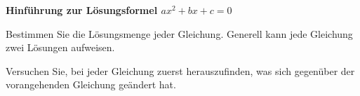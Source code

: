 



\usepackage{amssymb} 
\renewcommand{\metaHeaderLine}{Arbeitsblatt}
\renewcommand{\arbeitsblattTitel}{Einführung zur quadratischen Ergänzung}

\arbeitsblattHeader{}

\textbf{Hinführung zur Lösungsformel $ax^2+bx+c=0$}

Bestimmen Sie die Lösungsmenge jeder Gleichung. Generell kann jede Gleichung zwei Lösungen aufweisen.

Versuchen Sie, bei jeder Gleichung zuerst herauszufinden, was sich gegenüber der vorangehenden Gleichung geändert hat.

\newcommand{\noteSpace}{\noTRAINER{\mmPapier{4}}}

\newcommand{\quadGleichung}[4]{
\TRAINER{\hrulefill\\}%
\par
\needspace{4\baselineskip}
\begin{samepage}
\stepcounter{nuemmerli}(\thenuemmerli. )\,\,\,\, #1\\
\noTRAINER{\mmPapier{#2}}\TRAINER{{\color{black}#3}
{\\(Vorgehen: \color{blue}#4})}\\
\end{samepage}

}%

